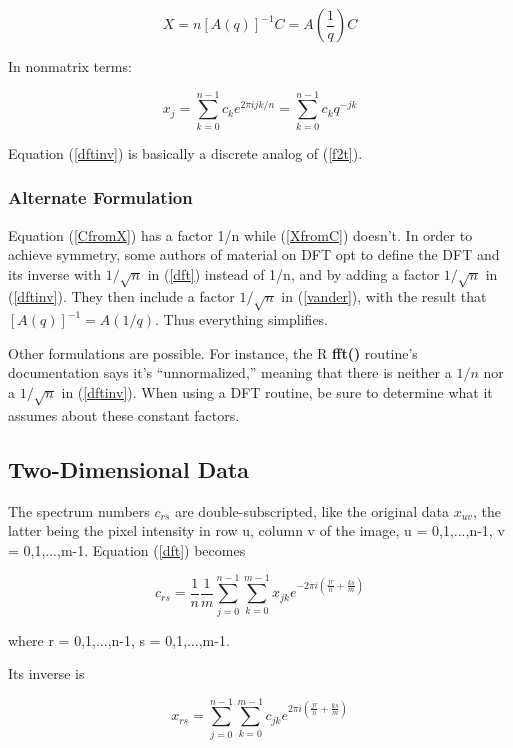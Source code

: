 \begin{equation}
\label{XfromC}
X = n [A(q)]^{-1} C = A(\frac{1}{q}) C
\end{equation}

In nonmatrix terms:

\begin{equation}
\label{dftinv}
x_j = 
\sum_{k=0}^{n-1} c_k e^{2\pi ijk/n}  =
\sum_{k=0}^{n-1} c_k q^{-jk} 
\end{equation}

Equation (\ref{dftinv}) is basically a discrete analog of (\ref{f2t}).

\subsubsection{Alternate Formulation}

Equation (\ref{CfromX}) has a factor 1/n while (\ref{XfromC}) doesn't.
In order to achieve symmetry, some authors of material on DFT opt to
define the DFT and its inverse with $1/\sqrt{n}$ in (\ref{dft}) instead
of 1/n, and by adding a factor $1/\sqrt{n}$ in (\ref{dftinv}).  They
then include a factor $1/\sqrt{n}$ in (\ref{vander}), with the result
that $[A(q)]^{-1} = A(1/q)$.  Thus everything simplifies.  

Other formulations are possible.  For instance, the R {\bf fft()}
routine's documentation says it's ``unnormalized,'' meaning that
there is neither a $1/n$ nor a $1/\sqrt{n}$ in (\ref{dftinv}). 
When using a DFT routine, be sure to determine what it assumes about
these constant factors.

\subsection{Two-Dimensional Data}

The spectrum numbers $c_{rs}$ are double-subscripted, like the original
data $x_{uv}$, the latter being the pixel intensity in row u, column v
of the image, u = 0,1,...,n-1, v = 0,1,...,m-1.  Equation (\ref{dft})
becomes

\begin{equation}
\label{dft2} 
c_{rs} = \frac{1}{n} \frac{1}{m} 
\sum_{j=0}^{n-1} 
\sum_{k=0}^{m-1} 
x_{jk} e^{-2\pi i(\frac{jr}{n}+\frac{ks}{m})}
\end{equation}

where r = 0,1,...,n-1, s = 0,1,...,m-1.

Its inverse is

\begin{equation}
\label{dft2inv}
x_{rs} = 
\sum_{j=0}^{n-1}
\sum_{k=0}^{m-1}
c_{jk} e^{2\pi i(\frac{jr}{n}+\frac{ks}{m})}
\end{equation}

